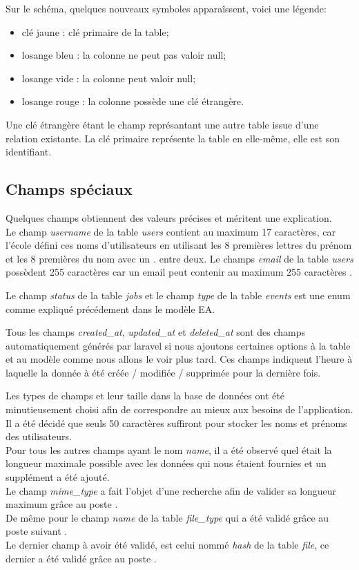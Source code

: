 \documentclass[
    iai, %
    il, %
]{heig-tb}
\begin{document}
Sur le schéma, quelques nouveaux symboles apparaîssent, voici une légende:
\begin{itemize}
    \item clé jaune : clé primaire de la table;
    \item losange bleu : la colonne ne peut pas valoir null;
    \item losange vide : la colonne peut valoir null;
    \item losange rouge : la colonne possède une clé étrangère.
\end{itemize}

Une clé étrangère étant le champ représantant une autre table issue d'une relation existante. La clé primaire représente la table en elle-même, elle est son identifiant.

\subsection{Champs spéciaux}
Quelques champs obtiennent des valeurs précises et méritent une explication.\\
Le champ \emph{username} de la table \emph{users} contient au maximum 17 caractères, car l'école défini ces noms d'utilisateurs en utilisant les 8 premières lettres du prénom et les 8 premières du nom avec un \emph{.} entre deux.
Le champs \emph{email} de la table \emph{users} possèdent 255 caractères car un email peut contenir au maximum 255 caractères \cite{email-length}.

Le champ \emph{status} de la table \emph{jobs} et le champ \emph{type} de la table \emph{events} est une enum comme expliqué précédement dans le modèle EA.

Tous les champs \emph{created\_at}, \emph{updated\_at} et \emph{deleted\_at} sont des champs automatiquement générés par \Gls{laravel} si nous ajoutons certaines options à la table et au modèle comme nous allons le voir plus tard. Ces champs indiquent l'heure à laquelle la donnée à été créée / modifiée / supprimée pour la dernière fois.

Les types de champs et leur taille dans la base de données ont été minutieusement choisi afin de correspondre au mieux aux besoins de l'application. \\
Il a été décidé que seuls 50 caractères suffiront pour stocker les noms et prénoms des utilisateurs. \\
Pour tous les autres champs ayant le nom \emph{name}, il a été observé quel était la longueur maximale possible avec les données qui nous étaient fournies et un supplément a été ajouté. \\
Le champ \emph{mime\_type} a fait l'objet d'une recherche afin de valider sa longueur maximum grâce au poste \cite{mime-type-length}. \\
De même pour le champ \emph{name} de la table \emph{file\_type} qui a été validé grâce au poste suivant \cite{extension-length}. \\
Le dernier champ à avoir été validé, est celui nommé \emph{hash} de la table \emph{file}, ce dernier a été validé grâce au poste \cite{hash-256-length}.
\end{document}
